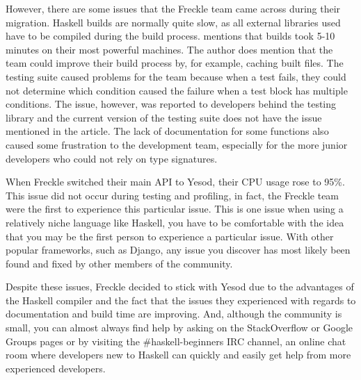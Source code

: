 However, there are some issues that the Freckle team came across during their migration.
Haskell builds are normally quite slow, as all external libraries used have to be
compiled during the build process. \citeauthor{frontrow} mentions that builds took
5-10 minutes on their most powerful machines. The author does mention that the team
could improve their build process by, for example, caching built files. The testing
suite caused problems for the team because when a test fails, they could not determine
which condition caused the failure when a test block has multiple conditions. The issue,
however, was reported to developers behind the testing library and the current
version of the testing suite does not have the issue mentioned in the article. The
lack of documentation for some functions also caused some frustration to the development
team, especially for the more junior developers who could not rely on type signatures. \parencite{frontrow}

When Freckle switched their main API to Yesod, their CPU usage rose to 95\%. This issue
did not occur during testing and profiling, in fact, the Freckle team were the first to
experience this particular issue. This is one issue when using a relatively niche language
like Haskell, you have to be comfortable with the idea that you may be the first person
to experience a particular issue. With other popular frameworks, such as Django, any issue
you discover has most likely been found and fixed by other members of the community.

Despite these issues, Freckle decided to stick with Yesod due to the advantages of the
Haskell compiler and the fact that the issues they experienced with regards to documentation
and build time are improving. And, although the community is small, you can almost
always find help by asking on the StackOverflow or Google Groups pages or by visiting
the \#haskell-beginners IRC channel, an online chat room where developers new to Haskell
can quickly and easily get help from more experienced developers.
